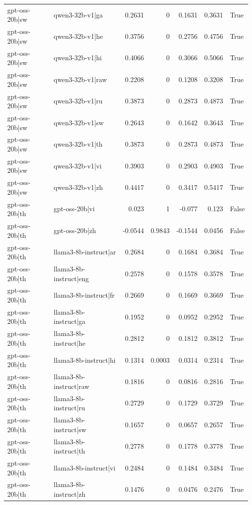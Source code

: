 \begin{table}
\begin{tabular}{l l r r r r l}
gpt-oss-20b|sw & qwen3-32b-v1|ga & 0.2631 & 0 & 0.1631 & 0.3631 & True \\
gpt-oss-20b|sw & qwen3-32b-v1|he & 0.3756 & 0 & 0.2756 & 0.4756 & True \\
gpt-oss-20b|sw & qwen3-32b-v1|hi & 0.4066 & 0 & 0.3066 & 0.5066 & True \\
gpt-oss-20b|sw & qwen3-32b-v1|raw & 0.2208 & 0 & 0.1208 & 0.3208 & True \\
gpt-oss-20b|sw & qwen3-32b-v1|ru & 0.3873 & 0 & 0.2873 & 0.4873 & True \\
gpt-oss-20b|sw & qwen3-32b-v1|sw & 0.2643 & 0 & 0.1642 & 0.3643 & True \\
gpt-oss-20b|sw & qwen3-32b-v1|th & 0.3873 & 0 & 0.2873 & 0.4873 & True \\
gpt-oss-20b|sw & qwen3-32b-v1|vi & 0.3903 & 0 & 0.2903 & 0.4903 & True \\
gpt-oss-20b|sw & qwen3-32b-v1|zh & 0.4417 & 0 & 0.3417 & 0.5417 & True \\
gpt-oss-20b|th & gpt-oss-20b|vi & 0.023 & 1 & -0.077 & 0.123 & False \\
gpt-oss-20b|th & gpt-oss-20b|zh & -0.0544 & 0.9843 & -0.1544 & 0.0456 & False \\
gpt-oss-20b|th & llama3-8b-instruct|ar & 0.2684 & 0 & 0.1684 & 0.3684 & True \\
gpt-oss-20b|th & llama3-8b-instruct|eng & 0.2578 & 0 & 0.1578 & 0.3578 & True \\
gpt-oss-20b|th & llama3-8b-instruct|fr & 0.2669 & 0 & 0.1669 & 0.3669 & True \\
gpt-oss-20b|th & llama3-8b-instruct|ga & 0.1952 & 0 & 0.0952 & 0.2952 & True \\
gpt-oss-20b|th & llama3-8b-instruct|he & 0.2812 & 0 & 0.1812 & 0.3812 & True \\
gpt-oss-20b|th & llama3-8b-instruct|hi & 0.1314 & 0.0003 & 0.0314 & 0.2314 & True \\
gpt-oss-20b|th & llama3-8b-instruct|raw & 0.1816 & 0 & 0.0816 & 0.2816 & True \\
gpt-oss-20b|th & llama3-8b-instruct|ru & 0.2729 & 0 & 0.1729 & 0.3729 & True \\
gpt-oss-20b|th & llama3-8b-instruct|sw & 0.1657 & 0 & 0.0657 & 0.2657 & True \\
gpt-oss-20b|th & llama3-8b-instruct|th & 0.2778 & 0 & 0.1778 & 0.3778 & True \\
gpt-oss-20b|th & llama3-8b-instruct|vi & 0.2484 & 0 & 0.1484 & 0.3484 & True \\
gpt-oss-20b|th & llama3-8b-instruct|zh & 0.1476 & 0 & 0.0476 & 0.2476 & True \\

\end{tabular}
\end{table}
